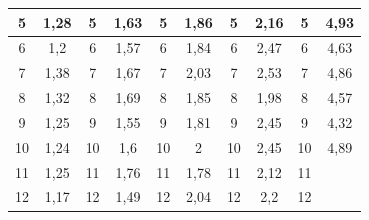 \documentclass[a4paper, 12pt]{article}
\begin{document}
\begin{table}[h]
\begin{tabular}{|cccccccccc|}
	\multicolumn{1}{|c|}{5}      & \multicolumn{1}{c|}{1,28}    & \multicolumn{1}{c|}{5}      & \multicolumn{1}{c|}{1,63}     & \multicolumn{1}{c|}{5}      & \multicolumn{1}{c|}{1,86}    & \multicolumn{1}{c|}{5}      & \multicolumn{1}{c|}{2,16}     & \multicolumn{1}{c|}{5}      & 4,93  \\ \hline
	\multicolumn{1}{|c|}{6}      & \multicolumn{1}{c|}{1,2}     & \multicolumn{1}{c|}{6}      & \multicolumn{1}{c|}{1,57}     & \multicolumn{1}{c|}{6}      & \multicolumn{1}{c|}{1,84}    & \multicolumn{1}{c|}{6}      & \multicolumn{1}{c|}{2,47}     & \multicolumn{1}{c|}{6}      & 4,63  \\ \hline
	\multicolumn{1}{|c|}{7}      & \multicolumn{1}{c|}{1,38}    & \multicolumn{1}{c|}{7}      & \multicolumn{1}{c|}{1,67}     & \multicolumn{1}{c|}{7}      & \multicolumn{1}{c|}{2,03}    & \multicolumn{1}{c|}{7}      & \multicolumn{1}{c|}{2,53}     & \multicolumn{1}{c|}{7}      & 4,86  \\ \hline
	\multicolumn{1}{|c|}{8}      & \multicolumn{1}{c|}{1,32}    & \multicolumn{1}{c|}{8}      & \multicolumn{1}{c|}{1,69}     & \multicolumn{1}{c|}{8}      & \multicolumn{1}{c|}{1,85}    & \multicolumn{1}{c|}{8}      & \multicolumn{1}{c|}{1,98}     & \multicolumn{1}{c|}{8}      & 4,57  \\ \hline
	\multicolumn{1}{|c|}{9}      & \multicolumn{1}{c|}{1,25}    & \multicolumn{1}{c|}{9}      & \multicolumn{1}{c|}{1,55}     & \multicolumn{1}{c|}{9}      & \multicolumn{1}{c|}{1,81}    & \multicolumn{1}{c|}{9}      & \multicolumn{1}{c|}{2,45}     & \multicolumn{1}{c|}{9}      & 4,32  \\ \hline
	\multicolumn{1}{|c|}{10}     & \multicolumn{1}{c|}{1,24}    & \multicolumn{1}{c|}{10}     & \multicolumn{1}{c|}{1,6}      & \multicolumn{1}{c|}{10}     & \multicolumn{1}{c|}{2}       & \multicolumn{1}{c|}{10}     & \multicolumn{1}{c|}{2,45}     & \multicolumn{1}{c|}{10}     & 4,89  \\ \hline
	\multicolumn{1}{|c|}{11}     & \multicolumn{1}{c|}{1,25}    & \multicolumn{1}{c|}{11}     & \multicolumn{1}{c|}{1,76}     & \multicolumn{1}{c|}{11}     & \multicolumn{1}{c|}{1,78}    & \multicolumn{1}{c|}{11}     & \multicolumn{1}{c|}{2,12}     & \multicolumn{1}{c|}{11}     &       \\ \hline
	\multicolumn{1}{|c|}{12}     & \multicolumn{1}{c|}{1,17}    & \multicolumn{1}{c|}{12}     & \multicolumn{1}{c|}{1,49}     & \multicolumn{1}{c|}{12}     & \multicolumn{1}{c|}{2,04}    & \multicolumn{1}{c|}{12}     & \multicolumn{1}{c|}{2,2}      & \multicolumn{1}{c|}{12}     &       \\ \hline

\end{tabular}
\end{table}
\end{document}
